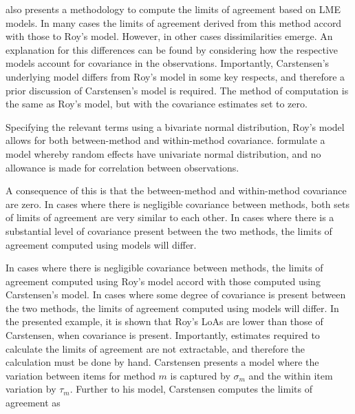 \documentclass[12pt, a4paper]{report}
\theoremstyle{plain}
\theoremstyle{definition}
\theoremstyle{remark}
\begin{document}



\citet{BXC2008} also presents a methodology to compute the limits of agreement based on LME models. In many cases the limits of agreement derived from this method accord with those to Roy's model. However, in other cases dissimilarities emerge. An explanation for this differences can be found by considering how the respective models account for covariance in the observations. Importantly, Carstensen's underlying model differs from Roy's model in some key respects, and therefore a prior discussion of Carstensen's model is required.
The method of computation is the same as Roy's model, but with the covariance estimates set to zero.

Specifying the relevant terms using a bivariate normal distribution, Roy's model allows for both between-method and within-method covariance. \citet{BXC2008} formulate a model whereby random effects have univariate normal distribution, and no allowance is made for correlation between observations.

A consequence of this is that the between-method and within-method covariance are zero. In cases where there is negligible covariance between methods, both sets of limits of agreement are very similar to each other. In cases where there is a substantial level of covariance present between the two methods, the limits of agreement computed using models will differ.

In cases where there is negligible covariance between methods, the limits of agreement computed using Roy's model accord with those computed using Carstensen's model. In cases where some degree of covariance is present between the two methods, the limits of agreement computed using models will differ. In the presented example, it is shown that Roy's LoAs are lower than those of Carstensen, when covariance is present. Importantly, estimates required to calculate the limits of agreement are not extractable, and therefore the calculation must be done by hand. Carstensen presents a model where the variation between items for
method $m$ is captured by $\sigma_m$ and the within item variation
by $\tau_m$. 	Further to his model, Carstensen computes the limits of agreement
as
\end{document}
